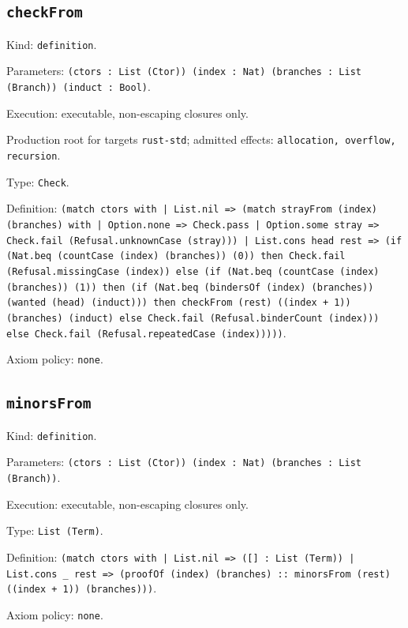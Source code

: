 \documentclass[11pt]{article}
\begin{document}
\subsection*{\texttt{checkFrom}}
\noindent Kind: \texttt{definition}.\par
\noindent Parameters: \texttt{(ctors : List (Ctor)) (index : Nat) (branches : List (Branch)) (induct : Bool)}.\par
\noindent Execution: executable, non-escaping closures only.\par
\noindent Production root for targets \texttt{rust-std}; admitted effects: \texttt{allocation, overflow, recursion}.\par
\noindent Type: \texttt{Check}.\par
\noindent Definition: \texttt{(match ctors with | List.nil => (match strayFrom (index) (branches) with | Option.none => Check.pass | Option.some stray => Check.fail (Refusal.unknownCase (stray))) | List.cons head rest => (if (Nat.beq (countCase (index) (branches)) (0)) then Check.fail (Refusal.missingCase (index)) else (if (Nat.beq (countCase (index) (branches)) (1)) then (if (Nat.beq (bindersOf (index) (branches)) (wanted (head) (induct))) then checkFrom (rest) ((index + 1)) (branches) (induct) else Check.fail (Refusal.binderCount (index))) else Check.fail (Refusal.repeatedCase (index)))))}.\par
\noindent Axiom policy: \texttt{none}.\par
\subsection*{\texttt{minorsFrom}}
\noindent Kind: \texttt{definition}.\par
\noindent Parameters: \texttt{(ctors : List (Ctor)) (index : Nat) (branches : List (Branch))}.\par
\noindent Execution: executable, non-escaping closures only.\par
\noindent Type: \texttt{List (Term)}.\par
\noindent Definition: \texttt{(match ctors with | List.nil => ([] : List (Term)) | List.cons \_ rest => (proofOf (index) (branches) :: minorsFrom (rest) ((index + 1)) (branches)))}.\par
\noindent Axiom policy: \texttt{none}.\par
\end{document}
